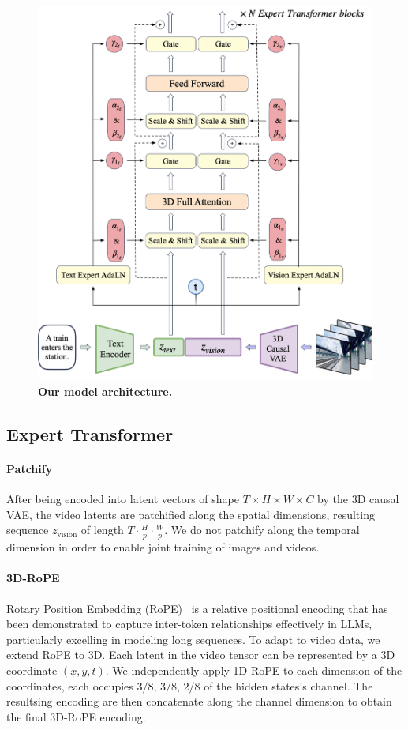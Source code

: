 \begin{figure}[h]
\begin{center}
\includegraphics[width=0.7\linewidth]{images/transformer.png}
\end{center}
\caption{\textbf{Our model architecture.} }
\label{fig:model}
\end{figure}

\subsection{Expert Transformer}\label{sec:expert-transformer}

\paragraph{Patchify}
After being encoded into latent vectors of shape $T \times H \times W \times C$ by the 3D causal VAE, the video latents are patchified  along the spatial dimensions, resulting sequence $z_{\text{vision}}$ of length $T\cdot \frac{H}{p} \cdot \frac{W}{p}$. 
We do not patchify along the temporal dimension in order to enable joint training of images and videos.

\paragraph{3D-RoPE}
Rotary Position Embedding (RoPE)~\citep{su2024roformer} is a relative positional encoding that has been demonstrated to capture inter-token relationships effectively in LLMs, particularly excelling in modeling long sequences. To adapt to video data, we extend RoPE to 3D. 
Each latent in the video tensor can be represented by a 3D coordinate $(x, y, t)$.
We independently apply 1D-RoPE to each dimension of the coordinates, each occupies $3/8$, $3/8$, $2/8$ of the hidden states's channel. The resultsing encoding are then concatenate along the channel dimension to obtain the final 3D-RoPE encoding.

